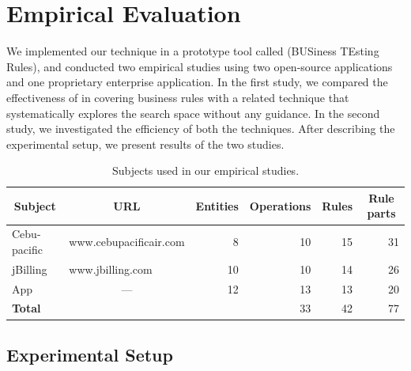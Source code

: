 \section{Empirical Evaluation}
\label{sec:eval}

We implemented our technique in a prototype tool called \tool{} (BUSiness
TEsting Rules), and conducted two empirical studies using two open-source
applications and one proprietary enterprise application. In the first study, we
compared the effectiveness of \tool{} in covering business rules with a related
technique that systematically explores the search space without any guidance. In
the second study, we investigated the efficiency of both the techniques. After
describing the experimental setup, we present results of the two studies.

\begin{table}[t]
\caption{Subjects used in our empirical studies.}
\centering
{\scriptsize
\tabcolsep=3pt
\begin{tabular}{|l|l|r|r|r|r|}
\hline
\multicolumn{1}{|c|}{Subject} & \multicolumn{1}{|c|}{URL} & \multicolumn{1}{|c|}{Entities} & \multicolumn{1}{|c|}{Operations} & \multicolumn{1}{|c|}{Rules} & \multicolumn{1}{|c|}{Rule parts} \\
\hline \hline
Cebu-pacific & www.cebupacificair.com 		& 8  & 10 & 15	 & 31 \\
jBilling 		 & www.jbilling.com 					& 10 & 10 & 14 	 & 26 \\
App 				 & \multicolumn{1}{|c|}{---}	& 12 & 13 & 13   & 20 \\
\hline \hline
\textbf{Total} & 													& 	 & 33 & 42   & 77 \\
\hline
\end{tabular}
}
\label{tab:subjects}
\end{table}


\subsection{Experimental Setup}
\label{sec:impl}

